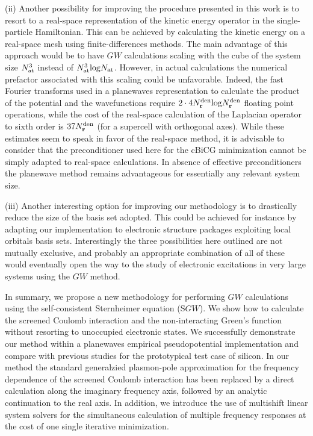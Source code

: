 \documentclass[twocolumn,prb,showpacs,superscriptaddress]{revtex4}
\def\r{{\bf r}}
\begin{document}
(ii) Another possibility for improving the procedure presented in this work
is to resort to a real-space representation of the kinetic energy operator
in the single-particle Hamiltonian. This can be achieved by
calculating the kinetic energy on a real-space mesh using finite-differences
methods.\cite{chelikowsky} The main advantage of this approach would be
to have $GW$ calculations scaling with the cube of the system size
$N_{\rm at}^3$ instead of $N_{\rm at}^3 {\rm log} N_{\rm at}$.
However, in actual calculations the numerical prefactor associated with this scaling
could be unfavorable. Indeed, the fast Fourier transforms used in a planewaves
representation to calculate the product of the potential and the wavefunctions
require $2\cdot 4 N_\r^{\rm den} {\rm log} N_\r^{\rm den}$ floating point operations,
while the cost of the real-space calculation of the Laplacian operator
to sixth order is $37 N_\r^{\rm den}$
(for a supercell with orthogonal axes).\cite{chelikowsky} 
While these estimates seem to speak in favor of the real-space method,
it is advisable to consider that the preconditioner used here\cite{tpa} for the 
cBiCG minimization cannot be simply adapted to real-space calculations.
In absence of effective preconditioners the planewave method
remains advantageous for essentially any relevant system size.

(iii) Another interesting option for improving our methodology is 
to drastically reduce the size of the basis set adopted. This could be achieved
for instance by adapting our implementation to electronic structure packages
exploiting local orbitals basis sets.\cite{siesta}
Interestingly the three possibilities here outlined are not mutually exclusive,
and probably an appropriate combination of all of these would eventually open
the way to the study of electronic excitations in
very large systems using the $GW$ method.

In summary, we propose a new methodology for performing $GW$ calculations
using the self-consistent Sternheimer equation (S$GW$). We show how
to calculate the screened Coulomb interaction and the non-interacting
Green's function without resorting to unoccupied electronic states.
We successfully demonstrate our method within a planewaves empirical
pseudopotential implementation and compare with previous studies for the
prototypical test case of silicon. In our method the standard generalzied plasmon-pole
approximation for the frequency dependence of the screened Coulomb interaction
has been replaced by a direct calculation along the imaginary frequency axis,
followed by an analytic continuation to the real axis.
In addition, we introduce the use of multishift linear system solvers for the simultaneous
calculation of multiple frequency responses at the cost of one single
iterative minimization.
\end{document}
